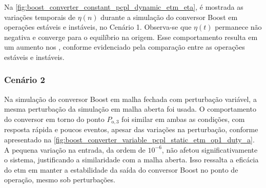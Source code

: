 Na \autoref{fig:boost_converter_constant_pcpl_dynamic_etm_eta}, é mostrada as variações temporais de $\eta(n)$ durante a simulação do conversor Boost em operações estáveis e instáveis, no Cenário 1. Observa-se que $\eta(t)$ permanece não negativa e converge para o equilíbrio na origem. Esse comportamento resulta em um aumento nos , conforme evidenciado pela comparação entre as operações estáveis e instáveis.

\subsubsection{Cenário 2}

Na simulação do conversor Boost em malha fechada com perturbação variável, a mesma perturbação da simulação em malha aberta foi usada. O comportamento do conversor em torno do ponto $P_{\mathrm{o}, 3}$ foi similar em ambas as condições, com resposta rápida e poucos eventos, apesar das variações na perturbação, conforme apresentado na \autoref{fig:boost_converter_variable_pcpl_static_etm_op1_duty_a}. A pequena variação na entrada, da ordem de $10^{-6}$, não afetou significativamente o sistema, justificando a similaridade com a malha aberta. Isso ressalta a eficácia do \acrshort{etm} em manter a estabilidade da saída do conversor Boost no ponto de operação, mesmo sob perturbações.


